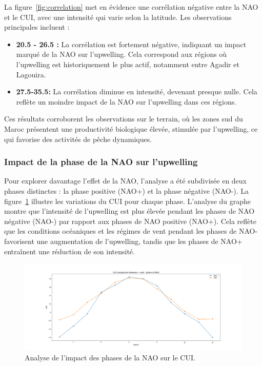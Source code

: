La figure~\ref{fig:correlation} met en évidence une corrélation négative entre la NAO et le CUI, avec une intensité qui varie selon la latitude. Les observations principales incluent :
\begin{itemize}
    \item \textbf{20.5 - 26.5 :} La corrélation est fortement négative, indiquant un impact marqué de la NAO sur l'upwelling. Cela correspond aux régions où l’upwelling est historiquement le plus actif, notamment entre Agadir et Lagouira.
    \item \textbf{27.5-35.5:} La corrélation diminue en intensité, devenant presque nulle. Cela reflète un moindre impact de la NAO sur l’upwelling dans ces régions.
\end{itemize}

Ces résultats corroborent les observations sur le terrain, où les zones sud du Maroc présentent une productivité biologique élevée, stimulée par l'upwelling, ce qui favorise des activités de pêche dynamiques.

\subsubsection{Impact de la phase de la NAO sur l'upwelling}
Pour explorer davantage l’effet de la NAO, l’analyse a été subdivisée en deux phases distinctes : la phase positive (NAO+) et la phase négative (NAO-). La figure~\ref{fig:impact_phases} illustre les variations du CUI pour chaque phase. L'analyse du graphe montre que l'intensité de l'upwelling est plus élevée pendant les phases de NAO négative (NAO-) par rapport aux phases de NAO positive (NAO+). Cela reflète que les conditions océaniques et les régimes de vent pendant les phases de NAO- favorisent une augmentation de l'upwelling, tandis que les phases de NAO+ entraînent une réduction de son intensité.

\begin{figure}[H]
\centering
\includegraphics[scale=0.3]{CUI_NAO_PHASES.png}
\caption{Analyse de l'impact des phases de la NAO sur le CUI.}
\label{fig:impact_phases}
\end{figure}

